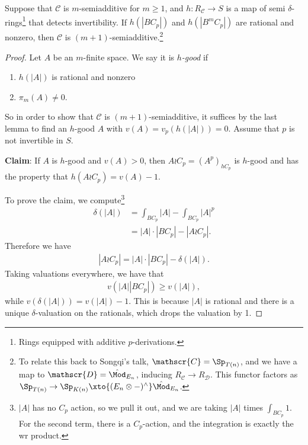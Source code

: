 \begin{proposition} Suppose that $\mathscr{C}$ is $m$-semiadditive for $m\ge 1$, and $h: R_\mathscr{C} \to S$ is a map of semi $\delta$-rings\footnote{Rings equipped with additive $p$-derivations.} that detects invertibility. If $h(|BC_p|)$ and $h(|B^mC_p|)$ are rational and nonzero, then $\mathscr{C}$ is $(m+1)$-semiadditive.\footnote{To relate this back to Songqi's talk, $\mathscr{C} = \Sp_{T(n)}$, and we have a map to $\mathscr{D} = \hat{\Mod}_{E_n}$, inducing $R_\mathscr{C} \to R_\mathscr{D}$. This functor factors as $\Sp_{T(n)} \to \Sp_{K(n)} \xto{(E_n \otimes -)^\wedge} \hat{\Mod}_{E_n}$.}
\end{proposition}
\begin{proof} Let $A$ be an $m$-finite space. We say it is $h$\textit{-good} if
\begin{enumerate}
    \item $h(|A|)$ is rational and nonzero
    \item $\pi_m(A) \ne 0$.
\end{enumerate}
So in order to show that $\mathscr{C}$ is $(m+1)$-semiadditive, it suffices by the last lemma to find an $h$-good $A$ with $v(A) = v_p(h(|A|)) = 0$. Assume that $p$ is not invertible in $S$.

\textbf{Claim}: If $A$ is $h$-good and $v(A) > 0$, then $A \wr C_p = \left( A^p \right)_{hC_p}$ is $h$-good and has the property that $h \left( A \wr C_p \right) = v(A) - 1$.

To prove the claim, we compute\footnote{$|A|$ has no $C_p$ action, so we pull it out, and we are taking $|A|$ times $\int_{BC_p}1$. For the second term, there is a $C_p$-action, and the integration is exactly the wr product.}
\begin{align*}
    \delta \left( |A| \right) &= \int_{BC_p} |A| - \int_{BC_p} |A|^p \\
    &= |A|\cdot|BC_p| - |A \wr C_p|.
\end{align*}
Therefore we have
\begin{align*}
    |A \wr C_p| = |A| \cdot |BC_p| - \delta \left( |A| \right).
\end{align*}
Taking valuations everywhere, we have that
\begin{align*}
    v \left( |A||BC_p| \right) \ge v(|A|),
\end{align*}
while $v(\delta(|A|)) = v(|A|) - 1$. This is because $|A|$ is rational and there is a unique $\delta$-valuation on the rationals, which drops the valuation by 1.
\end{proof}


